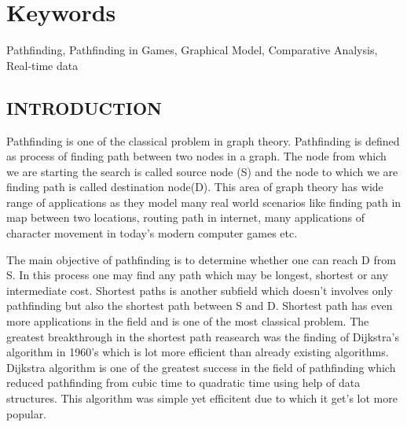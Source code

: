 \documentclass[a4paper, 12pt]{article}
\begin{document}
\section*{Keywords}
Pathfinding, Pathfinding in Games, Graphical Model, Comparative Analysis, Real-time 
data
\newpage
{}
\begin{center}
\section{INTRODUCTION}
\end{center}
\par
Pathfinding is one of the classical problem in graph theory. Pathfinding is defined as process of finding path between two nodes
in a graph. The node from which we are starting the search is called source node (S) and the node to which we are finding path is called
destination node(D). This area of graph theory has wide range of applications as they model many real world scenarios like 
finding path in map between two locations, routing path in internet, many applications of character movement in today's modern
computer games etc.
\\ 
 
\par The main objective of pathfinding is to determine whether one can reach D from S. In this process one may find any path which may be longest, shortest or any intermediate cost. Shortest paths is another subfield which doesn't involves only pathfinding but also the shortest path between S and D. Shortest path has even more applications in the field and is one of the most classical problem. The greatest breakthrough in the shortest path reasearch was the finding of Dijkstra's algorithm in 1960's which is lot more efficient than already existing algorithms. Dijkstra algorithm is one of the greatest success in the field of pathfinding which reduced pathfinding from 
cubic time to quadratic time using help of data structures. This algorithm was simple yet efficitent due to which it get's lot more popular.
\\
\end{document}
